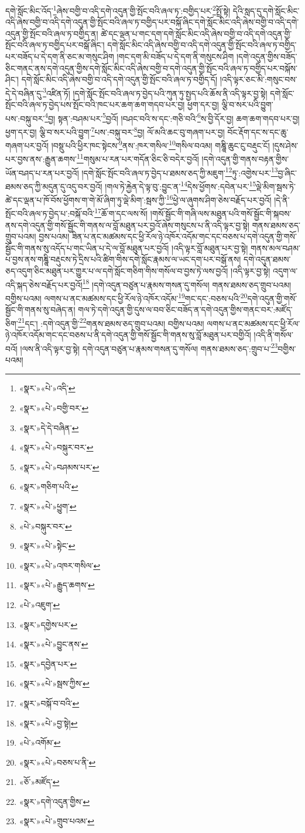 དགེ་སློང་མིང་འོད་\footnote{«སྣར་»«པེ་»འདི་}ཞེས་བགྱི་བ་འདི་དགེ་འདུན་གྱི་སྤོང་བའི་ཞལ་ཏ་:བགྱིད་པར་\footnote{«སྣར་»«པེ་»བགྱི་བར་}སྤྲོ་སྟེ། དེའི་སླད་དུ་དགེ་སློང་མིང་འདི་ཞེས་བགྱི་བ་འདི་དགེ་འདུན་གྱི་སྤོང་བའི་ཞལ་ཏ་བགྱིད་པར་བསྐོ་ཞིང་དགེ་སློང་མིང་འདི་ཞེས་བགྱི་བ་འདི་དགེ་འདུན་གྱི་སྤོང་བའི་ཞལ་ཏ་བགྱིད་ན། ཚེ་དང་ལྡན་པ་གང་དག་དགེ་སློང་མིང་འདི་ཞེས་བགྱི་བ་འདི་དགེ་འདུན་གྱི་སྤོང་བའི་ཞལ་ཏ་བགྱིད་པར་བསྒོ་ཞིང་། དགེ་སློང་མིང་འདི་ཞེས་བགྱི་བ་འདི་དགེ་འདུན་གྱི་སྤོང་བའི་ཞལ་ཏ་བགྱིད་པར་བཟོད་པ་དེ་དག་ནི་ཅང་མ་གསུང་ཤིག །གང་དག་མི་བཟོད་པ་དེ་དག་ནི་གསུངས་ཤིག །དགེ་འདུན་གྱིས་བཟོད་ཅིང་གནང་ནས་དགེ་འདུན་གྱིས་དགེ་སློང་མིང་འདི་ཞེས་བགྱི་བ་དགེ་འདུན་གྱི་སྤོང་བའི་ཞལ་ཏ་བགྱིད་པར་བསྐོས་ཤིང་། དགེ་སློང་མིང་འདི་ཞེས་བགྱི་བ་འདི་དགེ་འདུན་གྱི་སྤོང་བའི་ཞལ་ཏ་བགྱིད་དོ། །འདི་ལྟར་ཅང་མི་:གསུང་བས་དེ་དེ་བཞིན་དུ་\footnote{«སྣར་»དེ་དེ་བཞིན་}འཛིན་ཏོ། །དགེ་སློང་སྤོང་བའི་ཞལ་ཏ་བྱེད་པའི་ཀུན་ཏུ་སྤྱད་པའི་ཆོས་ནི་འདི་ལྟར་བྱ་སྟེ། དགེ་སློང་སྤོང་བའི་ཞལ་ཏ་བྱེད་པས་སྤོང་བའི་ཁང་པར་ཆག་ཆག་གདབ་པར་བྱ། ཕྱག་དར་བྱ། ལྕི་བ་སར་པའི་བྱུག་པས་:བསྐུ་བར་\footnote{«སྣར་»«པེ་»བསྐུར་བར་}བྱ། སྟན་:བཤམ་པར་\footnote{«སྣར་»«པེ་»བཤམས་པར་}བྱའོ། །བཤང་བའི་ས་དང་:གཅི་བའི་\footnote{«སྣར་»གཅིག་པའི་}ས་བྱི་དོར་བྱ། ཆག་ཆག་གདབ་པར་བྱ། ཕྱག་དར་བྱ། ལྕི་བ་སར་པའི་བྱུག་\footnote{«སྣར་»«པེ་»ཕྱུག་}པས་:བསྐུ་བར་\footnote{«པེ་»བསྐུར་བར་}བྱ། ལོ་མའི་ཆང་བུ་གཞག་པར་བྱ། བོང་རྡོག་དང་ས་དང་ཆུ་གཞག་པར་བྱའོ། །བསྡུ་པའི་ཕྱིར་ཁང་སྟེངས་\footnote{«སྣར་»«པེ་»སྟེང་}ནས་:ཁར་གསིལ་\footnote{«སྣར་»«པེ་»འཁར་གསིལ་}གསིལ་བའམ། གཎྜཱི་ཆུང་ངུ་བརྡུང་ངོ། །དུས་ཤེས་པར་བྱས་ནས་:རྒྱུན་ཆགས་\footnote{«སྣར་»«པེ་»རྒྱུད་ཆགས་}གསུམ་པ་རན་པར་གདོན་ཅིང་ཅི་བདེར་བྱའོ། །དགེ་འདུན་གྱི་གནས་བརྟན་གྱིས་ཡོན་བཤད་པ་རན་པར་བྱའོ། །དགེ་སློང་སྤོང་བའི་ཞལ་ཏ་བྱེད་པ་ཐམས་ཅད་ཀྱི་མཇུག་\footnote{«པེ་»འཇུག་}ཏུ་:འགྱེས་པར་\footnote{«སྣར་»དགྱེས་པར་}བྱ་ཞིང་ཐམས་ཅད་ཀྱི་མདུན་དུ་འདུ་བར་བྱའོ། །གལ་ཏེ་རྐྱེན་དེ་ལྟ་བུ་:བྱུང་ན་\footnote{«སྣར་»«པེ་»བྱུང་ནས་}དེས་ཕྱོགས་:དབེན་པར་\footnote{«སྣར་»དབྱེན་པར་}ལྡེ་མིག་སྦས་ཏེ་ཚེ་དང་ལྡན་པ་ཁོ་བོས་ཕྱོགས་ག་གེ་མོ་ཞིག་ཏུ་ལྡེ་མིག་:སྦས་ཀྱི་\footnote{«སྣར་»«པེ་»སྦས་ཀྱིས་}ཕྱེ་ལ་ཞུགས་ཤིག་ཅེས་བརྗོད་པར་བྱའོ། །དེ་ནི་སྤོང་བའི་ཞལ་ཏ་བྱེད་པ་:བསྐོ་བའི་\footnote{«སྣར་»བསྐོ་བ་བའི་}ཆོ་ག་དང་ལས་སོ། །གསོ་སྦྱོང་གི་གཞི་ལས་མཐུན་པའི་གསོ་སྦྱོང་གི་སྐབས་ནས་དགེ་འདུན་གྱི་གསོ་སྦྱོང་གི་གནས་ལ་བློ་མཐུན་པར་བྱའོ་ཞེས་གསུངས་པ་ནི་འདི་ལྟར་བྱ་སྟེ། གནས་ཐམས་ཅད་གྲུབ་པའམ། བྱས་པའམ། ཟིན་པ་ནང་མཚམས་དང་ཕྱི་རོལ་ཉེ་འཁོར་འདོམ་གང་དང་བཅས་པ་དགེ་འདུན་གྱི་གསོ་སྦྱོང་གི་གནས་སུ་འདོད་པ་གང་ཡིན་པ་དེ་ལ་བློ་མཐུན་པར་བྱའོ། །འདི་ལྟར་བློ་མཐུན་པར་བྱ་སྟེ། གནས་མལ་བཤམ་པ་བྱས་ནས་གཎྜཱི་བརྡུངས་ཏེ་དྲིས་པའི་ཚིག་གིས་དགེ་སློང་རྣམས་ལ་ཡང་དག་པར་བསྒོ་ནས། དགེ་འདུན་ཐམས་ཅད་འདུག་ཅིང་མཐུན་པར་གྱུར་པ་ལ་དགེ་སློང་གཅིག་གིས་གསོལ་བ་བྱས་ཏེ་ལས་བྱའོ། །འདི་ལྟར་བྱ་སྟེ། འདུག་ལ་འདི་སྐད་ཅེས་བརྗོད་པར་བྱའོ།\footnote{«སྣར་»«པེ་»བྱ་སྟེ།} །དགེ་འདུན་བཙུན་པ་རྣམས་གསན་དུ་གསོལ། གནས་ཐམས་ཅད་གྲུབ་པའམ། བགྱིས་པའམ། ལགས་པ་ནང་མཚམས་དང་ཕྱི་རོལ་ཉེ་འཁོར་འདོམ་\footnote{«པེ་»འགོམ་}གང་དང་:བཅས་པའི་\footnote{«སྣར་»«པེ་»བཅས་པ་ནི་}དགེ་འདུན་གྱི་གསོ་སྦྱོང་གི་གནས་སུ་བཞེད་ན། གལ་ཏེ་དགེ་འདུན་གྱི་དུས་ལ་བབ་ཅིང་བཟོད་ན་དགེ་འདུན་གྱིས་གནང་བར་:མཛོད་ཅིག་\footnote{«ཅོ་»མཛོད་}དང་། :དགེ་འདུན་གྱི་\footnote{«སྣར་»དགེ་འདུན་གྱིས་}གནས་ཐམས་ཅད་གྲུབ་པའམ། བགྱིས་པའམ། ལགས་པ་ནང་མཚམས་དང་ཕྱི་རོལ་ཉེ་འཁོར་འདོམ་གང་དང་བཅས་པ་ནི་དགེ་འདུན་གྱི་གསོ་སྦྱོང་གི་གནས་སུ་བློ་མཐུན་པར་བགྱིའོ། །འདི་ནི་གསོལ་བའོ། །ལས་ནི་འདི་ལྟར་བྱ་སྟེ། དགེ་འདུན་བཙུན་པ་རྣམས་གསན་དུ་གསོལ། གནས་ཐམས་ཅད་:གྲུབ་པ་\footnote{«སྣར་»«པེ་»གྲུབ་པའམ་}བགྱིས་པའམ། 
